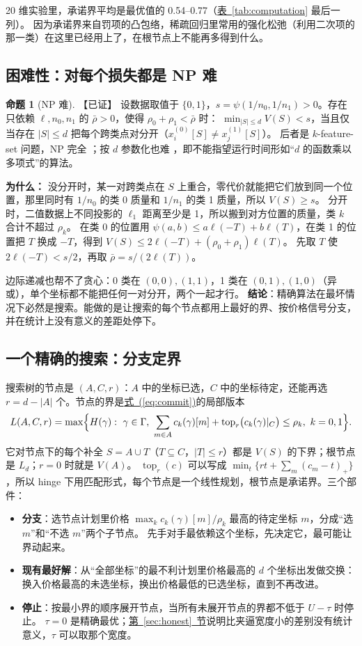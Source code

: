 \documentclass[11pt,a4paper,fontset=none]{ctexart}
\newcommand{\Eqref}[1]{\hyperref[#1]{式~(\ref*{#1})}}
\newcommand{\Secref}[1]{\hyperref[#1]{第~\ref*{#1}~节}}
\newcommand{\Tabref}[1]{\hyperref[#1]{表~\ref*{#1}}}
\newcommand{\topd}[1]{\operatorname{top}_{#1}}
\theoremstyle{definition}
\newtheorem{proposition}{命题}
\newenvironment{why}{\par\noindent\textbf{为什么：}\ignorespaces}{\par}
\newcommand{\status}[1]{\textrm{【#1】}}
\begin{document}
20 维实验里，承诺界平均是最优值的 0.54--0.77（\Tabref{tab:computation} 最后一列）。
因为承诺界来自罚项的凸包络，稀疏回归里常用的强化松弛（利用二次项的那一类）在这里已经用上了，在根节点上不能再多得到什么。

\subsection{困难性：对每个损失都是 NP 难}\label{sec:hard}
\begin{proposition}[NP 难]\label{prop:hard}\status{已证}
设数据取值于 $\{0,1\}$，$s=\psi(1/n_0,1/n_1)>0$。存在只依赖 $\ell,n_0,n_1$ 的 $\bar\rho>0$，使得 $\rho_0+\rho_1<\bar\rho$ 时：
$\min_{|S|\le d}V(S)<s$，当且仅当存在 $|S|\le d$ 把每个跨类点对分开（$x_i^{(0)}[S]\ne x_j^{(1)}[S]$）。
后者是 $k$-feature-set 问题，NP 完全 \cite{davies1994np}；按 $d$ 参数化也难 \cite{cotta2003kfeature}，即不能指望运行时间形如“$d$ 的函数乘以多项式”的算法。
\end{proposition}
\begin{why}
没分开时，某一对跨类点在 $S$ 上重合，零代价就能把它们放到同一个位置，那里同时有 $1/n_0$ 的类 0 质量和 $1/n_1$ 的类 1 质量，所以 $V(S)\ge s$。
分开时，二值数据上不同投影的 $\ell_1$ 距离至少是 1，所以搬到对方位置的质量，类 $k$ 合计不超过 $\rho_k$。
在类 0 的位置用 $\psi(a,b)\le a\ell(-T)+b\ell(T)$，在类 1 的位置把 $T$ 换成 $-T$，得到 $V(S)\le2\ell(-T)+(\rho_0+\rho_1)\ell(T)$。
先取 $T$ 使 $2\ell(-T)<s/2$，再取 $\bar\rho=s/(2\ell(T))$。
\end{why}
边际递减也帮不了贪心：0 类在 $(0,0),(1,1)$，1 类在 $(0,1),(1,0)$（异或），单个坐标都不能把任何一对分开，两个一起才行。
\textbf{结论}：精确算法在最坏情况下必然是搜索。能做的是让搜索的每个节点都用上最好的界、按价格信号分支，并在统计上没有意义的差距处停下。

\subsection{一个精确的搜索：分支定界}\label{sec:bnb}
搜索树的节点是 $(A,C,r)$：$A$ 中的坐标已选，$C$ 中的坐标待定，还能再选 $r=d-|A|$ 个。节点的界是\Eqref{eq:commit}的局部版本
\[
L(A,C,r)=\max\Bigl\{H(\gamma):\ \gamma\in\Gamma,\ \sum_{m\in A}c_k(\gamma)[m]+\topd r\bigl(c_k(\gamma)|_C\bigr)\le\rho_k,\ k=0,1\Bigr\}.
\]
它对节点下的每个补全 $S=A\cup T$（$T\subseteq C$，$|T|\le r$）都是 $V(S)$ 的下界；根节点是 $L_d$；$r=0$ 时就是 $V(A)$。
$\topd r(c)$ 可以写成 $\min_t\{rt+\sum_m(c_m-t)_+\}$，所以 hinge 下用匹配形式，每个节点是一个线性规划，根节点是承诺界。三个部件：
\begin{itemize}
\item \textbf{分支}：选节点计划里价格 $\max_kc_k(\gamma)[m]/\rho_k$ 最高的待定坐标 $m$，分成“选 $m$”和“不选 $m$”两个子节点。
先手对手最依赖这个坐标，先决定它，最可能让界动起来。
\item \textbf{现有最好解}：从“全部坐标”的最不利计划里价格最高的 $d$ 个坐标出发做交换：
换入价格最高的未选坐标，换出价格最低的已选坐标，直到不再改进。
\item \textbf{停止}：按最小界的顺序展开节点，当所有未展开节点的界都不低于 $U-\tau$ 时停止。
$\tau=0$ 是精确最优；\Secref{sec:honest}说明比夹逼宽度小的差别没有统计意义，$\tau$ 可以取那个宽度。
\end{itemize}
\end{document}
